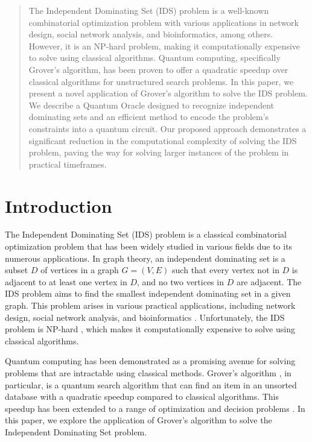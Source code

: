 \begin{abstract}
The Independent Dominating Set (IDS) problem is a well-known combinatorial optimization problem with various applications in network design, social network analysis, and bioinformatics, among others. However, it is an NP-hard problem, making it computationally expensive to solve using classical algorithms. Quantum computing, specifically Grover's algorithm, has been proven to offer a quadratic speedup over classical algorithms for unstructured search problems. In this paper, we present a novel application of Grover's algorithm to solve the IDS problem. We describe a Quantum Oracle designed to recognize independent dominating sets and an efficient method to encode the problem's constraints into a quantum circuit. Our proposed approach demonstrates a significant reduction in the computational complexity of solving the IDS problem, paving the way for solving larger instances of the problem in practical timeframes.
\end{abstract}

\section{Introduction}

The Independent Dominating Set (IDS) problem is a classical combinatorial optimization problem that has been widely studied in various fields due to its numerous applications. In graph theory, an independent dominating set is a subset $D$ of vertices in a graph $G = (V, E)$ such that every vertex not in $D$ is adjacent to at least one vertex in $D$, and no two vertices in $D$ are adjacent. The IDS problem aims to find the smallest independent dominating set in a given graph. This problem arises in various practical applications, including network design, social network analysis, and bioinformatics \cite{Haynes1998, Garey1979}. Unfortunately, the IDS problem is NP-hard \cite{Garey1979}, which makes it computationally expensive to solve using classical algorithms.

Quantum computing has been demonstrated as a promising avenue for solving problems that are intractable using classical methods. Grover's algorithm \cite{Grover1996}, in particular, is a quantum search algorithm that can find an item in an unsorted database with a quadratic speedup compared to classical algorithms. This speedup has been extended to a range of optimization and decision problems \cite{Durr1996, Montanaro2015}. In this paper, we explore the application of Grover's algorithm to solve the Independent Dominating Set problem.

